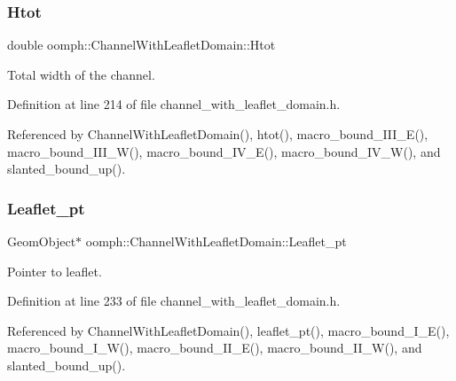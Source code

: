 \subsubsection{\texorpdfstring{Htot}{Htot}}
{\footnotesize\ttfamily double oomph\+::\+Channel\+With\+Leaflet\+Domain\+::\+Htot\hspace{0.3cm}{\ttfamily [protected]}}



Total width of the channel. 



Definition at line 214 of file channel\+\_\+with\+\_\+leaflet\+\_\+domain.\+h.



Referenced by Channel\+With\+Leaflet\+Domain(), htot(), macro\+\_\+bound\+\_\+\+I\+I\+I\+\_\+\+E(), macro\+\_\+bound\+\_\+\+I\+I\+I\+\_\+\+W(), macro\+\_\+bound\+\_\+\+I\+V\+\_\+\+E(), macro\+\_\+bound\+\_\+\+I\+V\+\_\+\+W(), and slanted\+\_\+bound\+\_\+up().

\mbox{\label{classoomph_1_1ChannelWithLeafletDomain_a08a8eb7078cdc788dc7643e09e7405fb}} 
\subsubsection{\texorpdfstring{Leaflet\+\_\+pt}{Leaflet\_pt}}
{\footnotesize\ttfamily Geom\+Object$\ast$ oomph\+::\+Channel\+With\+Leaflet\+Domain\+::\+Leaflet\+\_\+pt\hspace{0.3cm}{\ttfamily [protected]}}



Pointer to leaflet. 



Definition at line 233 of file channel\+\_\+with\+\_\+leaflet\+\_\+domain.\+h.



Referenced by Channel\+With\+Leaflet\+Domain(), leaflet\+\_\+pt(), macro\+\_\+bound\+\_\+\+I\+\_\+\+E(), macro\+\_\+bound\+\_\+\+I\+\_\+\+W(), macro\+\_\+bound\+\_\+\+I\+I\+\_\+\+E(), macro\+\_\+bound\+\_\+\+I\+I\+\_\+\+W(), and slanted\+\_\+bound\+\_\+up().

\mbox{\label{classoomph_1_1ChannelWithLeafletDomain_a0a50a8a7b274fb1dfc6d18c79ca884cd}} 
